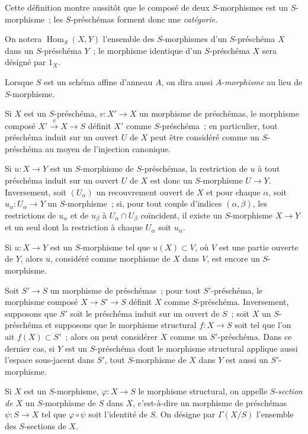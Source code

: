 Cette définition montre aussitôt que le composé de deux $S$-morphismes est un
$S$-morphisme~; les $S$-préschémas forment donc une \emph{catégorie}.

On notera $\operatorname{Hom}_S(X,Y)$ l'ensemble des $S$-morphismes d'un
$S$-préschéma $X$ dans un $S$-préschéma $Y$~; le morphisme identique d'un
$S$-préschéma $X$ sera désigné par $1_X$.

Lorsque $S$ est un schéma affine d'anneau $A$, on dira aussi
$A$-\emph{morphisme} au lieu de $S$-morphisme.

\begin{env}[2.5.3]
\label{I.2.5.3-fr}
Si $X$ est un $S$-préschéma, $v:X'\to X$ un morphisme de préschémas, le
morphisme composé $X'\xrightarrow{v}X\to S$ définit $X'$ comme
$S$-préschéma~; en particulier, tout préschéma induit sur un ouvert $U$ de
$X$ peut être considéré comme un $S$-préschéma au moyen de l'injection
canonique.

Si $u:X\to Y$ est un $S$-morphisme de $S$-préschémas, la restriction de $u$
à tout préschéma induit sur un ouvert $U$ de $X$ est donc un $S$-morphisme
$U\to Y$. Inversement, soit $(U_\alpha)$ un recouvrement ouvert de $X$ et pour
chaque $\alpha$, soit $u_\alpha:U_\alpha\to Y$ un $S$-morphisme~; si, pour tout
couple d'indices $(\alpha,\beta)$, les restrictions de $u_\alpha$ et de
$u_\beta$ à $U_\alpha\cap U_\beta$ coïncident, il existe un $S$-morphisme
$X\to Y$ et un seul dont la restriction à chaque $U_\alpha$ soit $u_\alpha$.

Si $u:X\to Y$ est un $S$-morphisme tel que $u(X)\subset V$, où $V$ est une
partie ouverte de $Y$, alors $u$, considéré comme morphisme de $X$ dans $V$,
est encore un $S$-morphisme.
\end{env}

\begin{env}[2.5.4]
\label{I.2.5.4-fr}
Soit $S'\to S$ un morphisme de préschémas~; pour tout $S'$-préschéma, le
morphisme composé $X\to S'\to S$ définit $X$ comme $S$-préschéma.
Inversement, supposons que $S'$ soit le préschéma induit sur un ouvert de
$S$~; soit $X$ un $S$-préschéma et supposons que le morphisme structural
$f:X\to S$ soit tel que l'on ait $f(X)\subset S'$~; alors on peut considérer
$X$ comme un $S'$-préschéma. Dans ce dernier cas, si $Y$ est un $S$-préschéma
dont le morphisme structural applique aussi l'espace sous-jacent dans $S'$,
tout $S$-morphisme de $X$ dans $Y$ est aussi un $S'$-morphisme.
\end{env}

\begin{env}[2.5.5]
\label{I.2.5.5-fr}
Si $X$ est un $S$-morphisme, $\varphi:X\to S$ le morphisme structural, on
appelle $S$-\emph{section de $X$} un $S$-morphisme de $S$ dans $X$,
c'est-à-dire un morphisme de préschémas $\psi:S\to X$ tel que
$\varphi\circ\psi$ soit l'identité de $S$. On désigne par $\Gamma(X/S)$
l'ensemble des $S$-sections de $X$.
\end{env}
